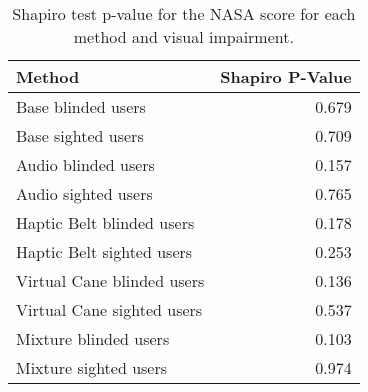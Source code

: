 
\begin{table}[!htb]
\centering
\caption{Shapiro test p-value for the NASA score for each method and visual impairment.}
\label{tab:shapiro_nasa_score}
\begin{tabular}{lr}
\toprule
                    Method &  Shapiro P-Value \\
\midrule
        Base blinded users &            0.679 \\
        Base sighted users &            0.709 \\
       Audio blinded users &            0.157 \\
       Audio sighted users &            0.765 \\
 Haptic Belt blinded users &            0.178 \\
 Haptic Belt sighted users &            0.253 \\
Virtual Cane blinded users &            0.136 \\
Virtual Cane sighted users &            0.537 \\
     Mixture blinded users &            0.103 \\
     Mixture sighted users &            0.974 \\
\bottomrule
\end{tabular}
\end{table}

